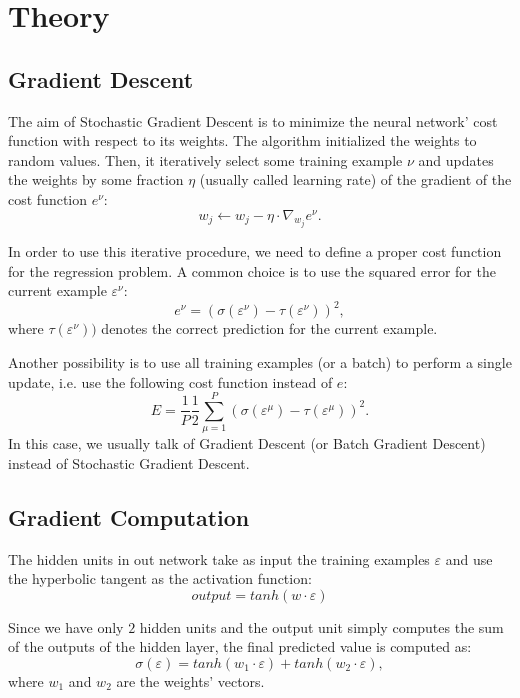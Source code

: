 \section{Theory}
\label{sec:theory}

\subsection{Gradient Descent}
The aim of Stochastic Gradient Descent is to minimize the neural network' cost function with respect to its weights.
The algorithm initialized the weights to random values.
Then, it iteratively select some training example $\nu$ and updates the weights by some fraction $\eta$ (usually called learning rate) of the gradient of the cost function $e^\nu$:
\begin{equation}
    \label{eq:weights-update}
    w_j \leftarrow w_j - \eta \cdot \nabla_{w_j} e^\nu.
\end{equation}

In order to use this iterative procedure, we need to define a proper cost function for the regression problem.
A common choice is to use the squared error for the current example $\varepsilon^\nu$:
\begin{equation}
    \label{eq:cost}
    e^\nu = (\sigma(\varepsilon^\nu) - \tau(\varepsilon^\nu))^2,
\end{equation}
where $\tau(\varepsilon^\nu))$ denotes the correct prediction for the current example.

Another possibility is to use all training examples (or a batch) to perform a single update, i.e. use the following cost function instead of $e$:
\begin{equation}
    E = \frac{1}{P}\frac{1}{2} \sum_{\mu = 1}^{P} (\sigma(\varepsilon^\mu) - \tau(\varepsilon^\mu))^2.
\end{equation}
In this case, we usually talk of Gradient Descent (or Batch Gradient Descent) instead of Stochastic Gradient Descent.

\subsection{Gradient Computation}
The hidden units in out network take as input the training examples $\varepsilon$ and use the hyperbolic tangent as the activation function:
\begin{equation}
    output = tanh(w \cdot \varepsilon)
\end{equation}

Since we have only $2$ hidden units and the output unit simply computes the sum of the outputs of the hidden layer, the final predicted value is computed as:
\begin{equation}
    \sigma (\varepsilon) = tanh(w_1 \cdot \varepsilon) + tanh(w_2 \cdot \varepsilon),
\end{equation}
where $w_1$ and $w_2$ are the weights' vectors.

